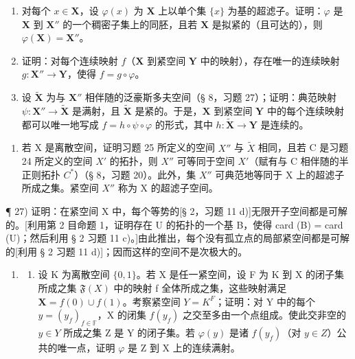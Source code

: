 \begin{enumerate}
\def\labelenumi{\alph{enumi})}
\setcounter{enumi}{2}
\item
  对每个 \(x \in \mathbf{X}\)，设 \(\varphi(x)\) 为 \(\mathbf{X}\) 上以单个集 \(\{x\}\) 为基的超滤子。证明：\(\varphi\) 是 \(\mathbf{X}\) 到 \(\mathbf{X}''\) 的一个稠密子集上的同胚，且若 \(\mathbf{X}\) 是拟紧的（且可达的），则 \(\varphi(\mathbf{X}) = \mathbf{X}''\)。
\item
  证明：对每个连续映射 \(f\)（\(\mathbf{X}\) 到紧空间 \(\mathbf{Y}\) 中的映射），存在唯一的连续映射 \(g: \mathbf{X}'' \to \mathbf{Y}\)，使得 \(f = g \circ \varphi\)。
\item
  设 \(\tilde{\mathbf{X}}\) 为与 \(\mathbf{X}''\) 相伴随的泛豪斯多夫空间（§ 8，习题 27）；证明：典范映射 \(\psi: \mathbf{X}'' \to \tilde{\mathbf{X}}\) 是满射，且 \(\tilde{\mathbf{X}}\) 是紧的。于是，\(\mathbf{X}\) 到紧空间 \(\mathbf{Y}\) 中的每个连续映射都可以唯一地写成 \(f = h \circ \psi \circ \varphi\) 的形式，其中 \(h: \tilde{\mathbf{X}} \to \mathbf{Y}\) 是连续的。
\end{enumerate}

\begin{enumerate}
\def\labelenumi{\arabic{enumi})}
\setcounter{enumi}{25}
\tightlist
\item
  若 X 是离散空间，证明习题 25 所定义的空间 \(X''\) 与 \(\tilde{X}\) 相同，且若 C 是习题 24 所定义的空间 \(X'\) 的拓扑，则 \(X''\) 可等同于空间 \(X'\)（赋有与 C 相伴随的半正则拓扑 \(C^*\)）（§ 8，习题 20）。此外，集 \(X''\) 可典范地等同于 X 上的超滤子所成之集。紧空间 \(X''\) 称为 X 的超滤子空间。
\end{enumerate}

¶ 27) 证明：在紧空间 X 中，每个等势的{[}§ 2，习题 11 d){]}无限开子空间都是可解的。{[}利用第 2 目命题 1，证明存在 U 的拓扑的一个基 B，使得 card (B) = card (U)；然后利用 § 2 习题 11 c)。{]}由此推出，每个没有孤立点的局部紧空间都是可解的{[}利用 § 2 习题 11 d){]}；因而这样的空间不是次极大的。

\begin{enumerate}
\def\labelenumi{\arabic{enumi})}
\setcounter{enumi}{27}
\tightlist
\item
  \begin{enumerate}
  \def\labelenumii{\alph{enumii})}
  \tightlist
  \item
    设 K 为离散空间 \(\{0,1\}\)。若 X 是任一紧空间，设 F 为 K 到 X 的闭子集所成之集 \(\mathfrak{F}(X)\) 中的映射 f 全体所成之集，这些映射满足 \(\mathbf{X}=f(0)\cup f(1)\)。考察紧空间 \(Y=K^{F}\)；证明：对 Y 中的每个 \(y=(y_{f})_{f\in\mathbb{F}}\)，X 的闭集 \(f(y_{f})\) 之交至多由一个点组成。使此交非空的 \(y\in Y\) 所成之集 Z 是 Y 的闭子集。若 \(\varphi(y)\) 是诸 \(f(y_{f})\)（对 \(y\in Z\)）公共的唯一点，证明 \(\varphi\) 是 Z 到 X 上的连续满射。
  \end{enumerate}
\end{enumerate}

